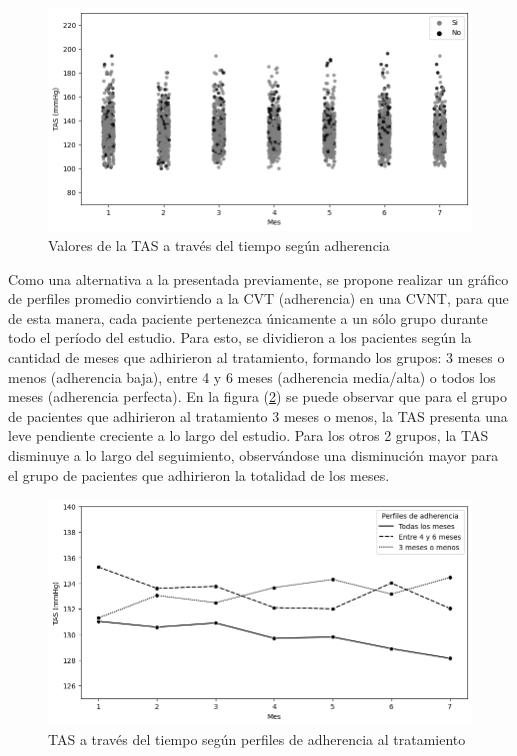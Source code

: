 \documentclass[spanish]{article}
\numberwithin{figure}{subsection}
\numberwithin{equation}{subsection}
\numberwithin{table}{subsection}
\begin{document}
\begin{figure}[H]
	\centering
	\includegraphics[scale=0.5]{img/TAS_vs_tpo_with_adherencia_scatter.png}
	\caption{Valores de la TAS a través del tiempo según adherencia}
	\label{TAS_with_adh_scatter}
\end{figure}

Como una alternativa a la presentada previamente, se propone realizar un gráfico
de perfiles promedio convirtiendo a la CVT (adherencia) en una CVNT, para que de
esta manera, cada paciente pertenezca únicamente a un sólo grupo durante todo el
período del estudio. Para esto, se dividieron a los pacientes según la cantidad
de meses que adhirieron al tratamiento, formando los grupos: 3 meses o menos
(adherencia baja), entre 4 y 6 meses (adherencia media/alta) o todos los meses
(adherencia perfecta). En la figura (\ref{TAS_with_adh}) se puede observar que
para el grupo de pacientes que adhirieron al tratamiento 3 meses o menos, la TAS
presenta una leve pendiente creciente a lo largo del estudio. Para los otros 2
grupos, la TAS disminuye a lo largo del seguimiento, observándose una
disminución mayor para el grupo de pacientes que adhirieron la totalidad de los
meses.

\begin{figure}[H]
	\centering
	\includegraphics[scale=0.5]{img/TAS_vs_tpo_with_adherencia.png}
	\caption{TAS a través del tiempo según perfiles de adherencia al tratamiento}
	\label{TAS_with_adh}
\end{figure}
\end{document}
